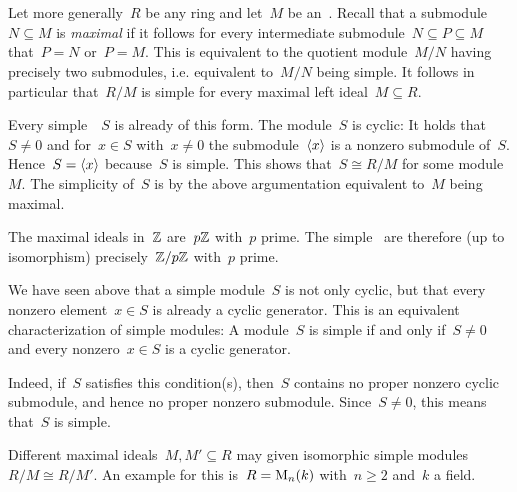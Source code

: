 \section{}





\subsection{}
\label{classification of simple modules}

Let more generally~$R$ be any ring and let~$M$ be an~{}.
Recall that a submodule~$N \subseteq M$ is \emph{maximal} if it follows for every intermediate submodule~$N \subseteq P \subseteq M$ that~$P= N$ or~$P = M$.
This is equivalent to the quotient module~$M/N$ having precisely two submodules, i.e. equivalent to~$M/N$ being simple.
It follows in particular that~$R/M$ is simple for every maximal left ideal~$M \subseteq R$.

Every simple~~$S$ is already of this form.
The module~$S$ is cyclic:
It holds that~$S \neq 0$ and for~$x \in S$ with~$x \neq 0$ the submodule~$\langle x\rangle$ is a nonzero submodule of~$S$.
Hence~$S = \langle x\rangle$ because~$S$ is simple.
This shows that~$S \cong R/M$ for some module~$M$.
The simplicity of~$S$ is by the above argumentation equivalent to~$M$ being maximal.

The maximal ideals in~$\Integer$ are~$p \mathbb{Z}$ with~$p$ prime.
The simple~{\modules{$\Integer$}} are therefore (up to isomorphism) precisely~$\mathbb{Z}/p\mathbb{Z}$ with~$p$ prime.

\begin{remark}
  We have seen above that a simple module~$S$ is not only cyclic, but that every nonzero element~$x \in S$ is already a cyclic generator.
  This is an equivalent characterization of simple modules:
  A module~$S$ is simple if and only if~$S \neq 0$ and every nonzero~$x \in S$ is a cyclic generator.
  
  Indeed, if~$S$ satisfies this condition(s), then~$S$ contains no proper nonzero cyclic submodule, and hence no proper nonzero submodule.
  Since~$S \neq 0$, this means that~$S$ is simple.
\end{remark}

\begin{warning}
  Different maximal ideals~$M, M' \subseteq R$ may given isomorphic simple modules~$R/M \cong R/M'$.
  An example for this is~$R = \operatorname{M}_{n}(k)$ with~$n \geq 2$ and~$k$ a field.
\end{warning}





